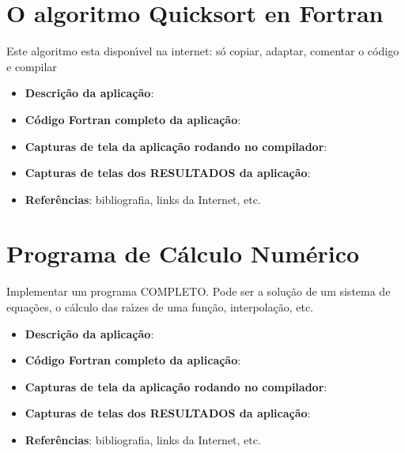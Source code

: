     \section{O algoritmo Quicksort en Fortran}
    Este algoritmo esta dispon\'{\i}vel na internet: s\'{o} copiar, adaptar, comentar o c\'{o}digo e compilar
    \begin{itemize}
      \item \textbf{Descri\c{c}\~{a}o da aplica\c{c}\~{a}o}:
      \item \textbf{C\'{o}digo Fortran completo da aplica\c{c}\~{a}o}:
      \item \textbf{Capturas de tela da aplica\c{c}\~{a}o rodando no compilador}:
      \item \textbf{Capturas de telas dos RESULTADOS da aplica\c{c}\~{a}o}:
      \item \textbf{Refer\^{e}ncias}: bibliografia, links da Internet, etc.
    \end{itemize}


    \section{Programa de C\'{a}lculo Num\'{e}rico}
    Implementar um programa COMPLETO. Pode ser a solu\c{c}\~{a}o de um sistema de equa\c{c}\~{o}es, o c\'{a}lculo das ra\'{\i}zes de uma fun\c{c}\~{a}o,  interpola\c{c}\~{a}o, etc.
    \begin{itemize}
      \item \textbf{Descri\c{c}\~{a}o da aplica\c{c}\~{a}o}:
      \item \textbf{C\'{o}digo Fortran completo da aplica\c{c}\~{a}o}:
      \item \textbf{Capturas de tela da aplica\c{c}\~{a}o rodando no compilador}:
      \item \textbf{Capturas de telas dos RESULTADOS da aplica\c{c}\~{a}o}:
      \item \textbf{Refer\^{e}ncias}: bibliografia, links da Internet, etc.
    \end{itemize}


